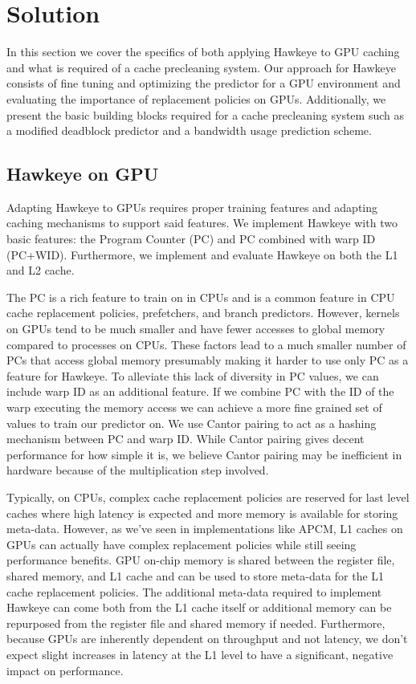 \chapter{Solution}

In this section we cover the specifics of both applying Hawkeye to GPU caching and what is required of a cache precleaning system. Our approach for Hawkeye consists of fine tuning and optimizing the predictor for a GPU environment and evaluating the importance of replacement policies on GPUs. Additionally, we present the basic building blocks required for a cache precleaning system such as a modified deadblock predictor and a bandwidth usage prediction scheme.

\section{Hawkeye on GPU}
Adapting Hawkeye to GPUs requires proper training features and adapting caching mechanisms to support said features. We implement Hawkeye with two basic features: the Program Counter (PC) and PC combined with warp ID (PC+WID). Furthermore, we implement and evaluate Hawkeye on both the L1 and L2 cache.

The PC is a rich feature to train on in CPUs and is a common feature in CPU cache replacement policies, prefetchers, and branch predictors. However, kernels on GPUs tend to be much smaller and have fewer accesses to global memory compared to processes on CPUs. These factors lead to a much smaller number of PCs that access global memory presumably making it harder to use only PC as a feature for Hawkeye. To alleviate this lack of diversity in PC values, we can include warp ID as an additional feature. If we combine PC with the ID of the warp executing the memory access we can achieve a more fine grained set of values to train our predictor on. We use Cantor pairing to act as a hashing mechanism between PC and warp ID. While Cantor pairing gives decent performance for how simple it is, we believe Cantor pairing may be inefficient in hardware because of the multiplication step involved.

Typically, on CPUs, complex cache replacement policies are reserved for last level caches where high latency is expected and more memory is available for storing meta-data. However, as we’ve seen in implementations like APCM, L1 caches on GPUs can actually have complex replacement policies while still seeing performance benefits. GPU on-chip memory is shared between the register file, shared memory, and L1 cache and can be used to store meta-data for the L1 cache replacement policies. The additional meta-data required to implement Hawkeye can come both from the L1 cache itself or additional memory can be repurposed from the register file and shared memory if needed. Furthermore, because GPUs are inherently dependent on throughput and not latency, we don't expect slight increases in latency at the L1 level to have a significant, negative impact on performance.

